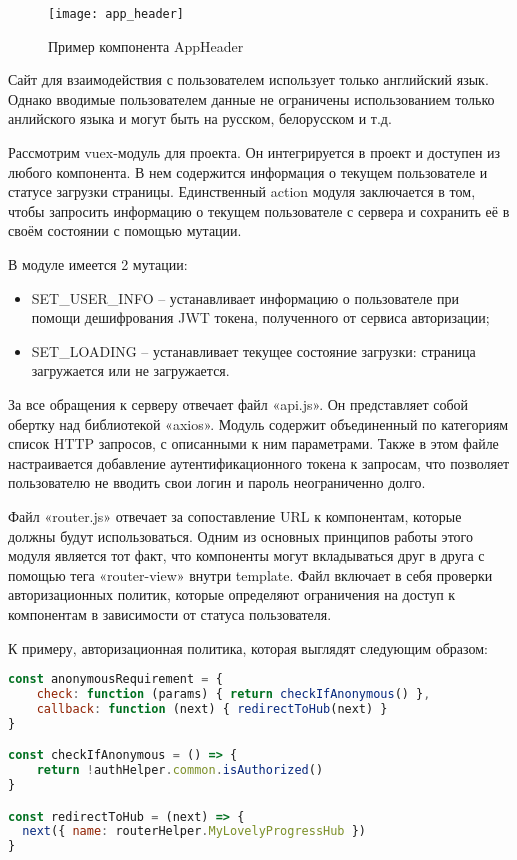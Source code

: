 \begin{figure}[h]
    \centering
    \texttt{[image: app\_header]}
    \caption{Пример компонента AppHeader}\label{fig:app_header}
\end{figure}

Сайт для взаимодействия с пользователем использует только английский язык. Однако вводимые пользователем данные не ограничены использованием только анлийского языка и могут быть на русском, белорусском и т.д.

Рассмотрим vuex-модуль для проекта. Он интегрируется в проект и доступен из любого компонента. В нем содержится информация о текущем пользователе и статусе загрузки страницы. Единственный action модуля заключается в том, чтобы запросить информацию о текущем пользователе с сервера и сохранить её в своём состоянии с помощью мутации.

В модуле имеется 2 мутации:

\begin{itemize}
    \item SET\_USER\_INFO – устанавливает информацию о пользователе при помощи дешифрования JWT токена, полученного от сервиса авторизации;
    \item SET\_LOADING – устанавливает текущее состояние загрузки: страница загружается или не загружается.
\end{itemize}

За все обращения к серверу отвечает файл «api.js». Он представляет собой обертку над библиотекой «axios». Модуль содержит объединенный по категориям список HTTP запросов, с описанными к ним параметрами. Также в этом файле настраивается добавление аутентификационного токена к запросам, что позволяет пользователю не вводить свои логин и пароль неограниченно долго. 

Файл «router.js» отвечает за сопоставление URL к компонентам, которые должны будут использоваться. Одним из основных принципов работы этого модуля является тот факт, что компоненты могут вкладываться друг в друга с помощью тега «router-view» внутри template. Файл включает в себя проверки авторизационных политик, которые определяют ограничения на доступ к компонентам в зависимости от статуса пользователя.

К примеру, авторизационная политика, которая выглядят следующим образом:

\begin{lstlisting}[language=javascript]
const anonymousRequirement = {
    check: function (params) { return checkIfAnonymous() },
    callback: function (next) { redirectToHub(next) }
}

const checkIfAnonymous = () => {
    return !authHelper.common.isAuthorized()
}

const redirectToHub = (next) => {
  next({ name: routerHelper.MyLovelyProgressHub })
}
\end{lstlisting}

